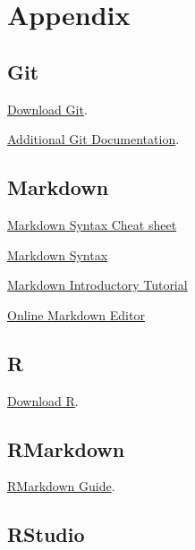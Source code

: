 \documentclass[
]{book}
\begin{document}
\hypertarget{appendix}{%
\chapter*{Appendix}\label{appendix}}

\hypertarget{git}{%
\section*{Git}\label{git}}

\href{https://git-scm.com/downloads}{Download Git}.

\href{https://git-scm.com/doc}{Additional Git Documentation}.

\hypertarget{markdown}{%
\section*{Markdown}\label{markdown}}

\href{https://www.markdownguide.org/cheat-sheet/}{Markdown Syntax Cheat sheet}

\href{https://www.markdownguide.org/basic-syntax}{Markdown Syntax}

\href{https://www.markdowntutorial.com/lesson/1/}{Markdown Introductory Tutorial}

\href{https://markdown-editor.github.io/}{Online Markdown Editor}

\hypertarget{r}{%
\section*{R}\label{r}}

\href{https://cloud.r-project.org/}{Download R}.

\hypertarget{rmarkdown}{%
\section*{RMarkdown}\label{rmarkdown}}

\href{https://bookdown.org/yihui/rmarkdown/}{RMarkdown Guide}.

\hypertarget{rstudio}{%
\section*{RStudio}\label{rstudio}}
\end{document}
